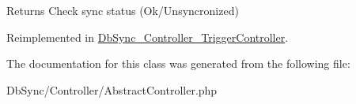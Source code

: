 \begin{DoxyReturn}{Returns}
Check sync status (Ok/Unsyncronized) 
\end{DoxyReturn}


Reimplemented in \hyperlink{classDbSync__Controller__TriggerController_a08d8439a825dd363b7fb8df076056f65}{DbSync\_\-Controller\_\-TriggerController}.



The documentation for this class was generated from the following file:\begin{DoxyCompactItemize}
\item 
DbSync/Controller/AbstractController.php\end{DoxyCompactItemize}

